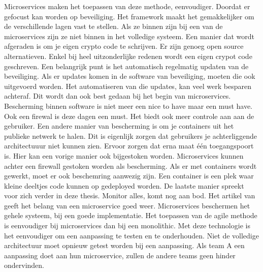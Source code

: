 Microservices maken het toepassen van deze methode, eenvoudiger. Doordat er gefocust kan worden op beveiliging. Het framework maakt het gemakkelijker om de verschillende lagen vast te stellen. Als ze binnen zijn bij een van de microservices zijn ze niet binnen in het volledige systeem. 
Een manier dat wordt afgeraden is om je eigen crypto code te schrijven. Er zijn genoeg open source alternatieven. Enkel bij heel uitzonderlijke redenen wordt een eigen crypot code geschreven. 
Een belangrijk punt is het automatisch regelmatig updaten van de beveiliging. Als er updates komen in de software van beveiliging, moeten die ook uitgevoerd worden. Het automatiseren van die updates, kan veel werk besparen achteraf. Dit wordt dan ook best gedaan bij het begin van microservices. Bescherming binnen software is niet meer een nice to have maar een must have. Ook een firewal is deze dagen een must. Het biedt ook meer controle aan aan de gebruiker. 
Een andere manier van bescherming is om je containers uit het publieke netwerk te halen. Dit is eigenlijk zorgen dat gebruikers je achterliggende architectuuur niet kunnen zien. Ervoor zorgen dat erna maat één toegangspoort is.  Hier kan een vorige manier ook bijgestoken worden. Microservices kunnen achter een firewall gestoken worden als bescherming. 
Als er met containers wordt gewerkt, moet er ook beschemring aanwezig zijn. Een container is een plek waar kleine deeltjes code kunnen op gedeployed worden. 
De laatste manier spreekt voor zich verder in deze thesis. Monitor alles, komt nog aan bod.
Het artikel van \textcite{Watts2018} geeft het belang van een microservice goed weer. Microservices beschermen het gehele systeem, bij een goede implementatie. Het toepassen van de agile methode is eenvoudiger bij microservices dan bij een monolithic. Met deze technologie is het eenvoudiger om een aanpassing te testen en te onderhouden. Niet de volledige architectuur moet opnieuw getest worden bij een aanpassing. Als team A een aanpassing doet aan hun microservice, zullen de andere teams geen hinder ondervinden. 

